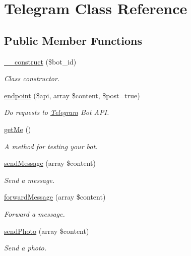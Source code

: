 \hypertarget{class_telegram}{}\section{Telegram Class Reference}
\label{class_telegram}
\subsection*{Public Member Functions}
\begin{DoxyCompactItemize}
\item 
\hyperlink{class_telegram_a340324043882a7c5e432ba045425f49a}{\+\_\+\+\_\+construct} (\$bot\+\_\+id)
\begin{DoxyCompactList}\small\item\em Class constructor. \end{DoxyCompactList}\item 
\hyperlink{class_telegram_a9241a37baf9b641df49a377c34bbdd59}{endpoint} (\$api, array \$content, \$post=true)
\begin{DoxyCompactList}\small\item\em Do requests to \hyperlink{class_telegram}{Telegram} Bot A\+P\+I. \end{DoxyCompactList}\item 
\hyperlink{class_telegram_a6bc057a9b0c03f8147a4294936b2494b}{get\+Me} ()
\begin{DoxyCompactList}\small\item\em A method for testing your bot. \end{DoxyCompactList}\item 
\hyperlink{class_telegram_af1369d6caab77f71a051ab73fa642a3f}{send\+Message} (array \$content)
\begin{DoxyCompactList}\small\item\em Send a message. \end{DoxyCompactList}\item 
\hyperlink{class_telegram_aebf3d567e947a457971c1501be7fc1fe}{forward\+Message} (array \$content)
\begin{DoxyCompactList}\small\item\em Forward a message. \end{DoxyCompactList}\item 
\hyperlink{class_telegram_ac7adcbd9f46b77664f8b738b84f290e7}{send\+Photo} (array \$content)
\begin{DoxyCompactList}\small\item\em Send a photo. \end{DoxyCompactList}\item 

\end{DoxyCompactItemize}
